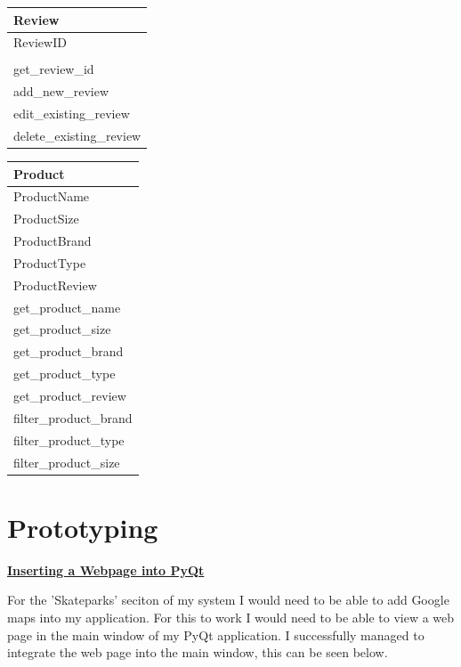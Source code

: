 \begin{center}
\begin{tabular}{|p{5cm}|}
    \hline
 \textbf{Review} \\ \hline
ReviewID\\

\\ \hline 

get\_review\_id \\
add\_new\_review \\
edit\_existing\_review \\
delete\_existing\_review \\

\hline

\end{tabular}
\label{tab:Review Class Definition}
\end{center}

\begin{center}
\begin{tabular}{|p{5cm}|}
    \hline
 \textbf{Product} \\ \hline
ProductName \\
ProductSize\\
ProductBrand \\
ProductType \\
ProductReview \\
\hline 

get\_product\_name \\
get\_product\_size \\
get\_product\_brand \\
get\_product\_type \\
get\_product\_review \\
filter\_product\_brand \\
filter\_product\_type \\
filter\_product\_size \\
\hline

\end{tabular}
\label{tab:Review Class Definition}
\end{center}





\section{Prototyping}

\textbf{\underline{Inserting a Webpage into PyQt}}

For the 'Skateparks' seciton of my system I would need to be able to add Google maps into my application. For this to work I would need to be able to view a web page in the main window of my PyQt application. I successfully managed to integrate the web page into the main window, this can be seen below.


